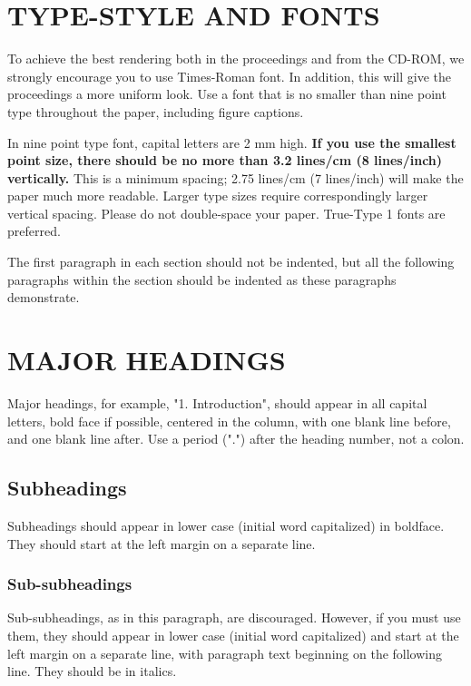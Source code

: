 \documentclass{article}
\begin{document}
\section{TYPE-STYLE AND FONTS}
\label{sec:typestyle}

To achieve the best rendering both in the proceedings and from the CD-ROM, we
strongly encourage you to use Times-Roman font.  In addition, this will give
the proceedings a more uniform look.  Use a font that is no smaller than nine
point type throughout the paper, including figure captions.

In nine point type font, capital letters are 2 mm high.  {\bf If you use the
smallest point size, there should be no more than 3.2 lines/cm (8 lines/inch)
vertically.}  This is a minimum spacing; 2.75 lines/cm (7 lines/inch) will make
the paper much more readable.  Larger type sizes require correspondingly larger
vertical spacing.  Please do not double-space your paper.  True-Type 1 fonts
are preferred.

The first paragraph in each section should not be indented, but all the
following paragraphs within the section should be indented as these paragraphs
demonstrate.

\section{MAJOR HEADINGS}
\label{sec:majhead}

Major headings, for example, "1. Introduction", should appear in all capital
letters, bold face if possible, centered in the column, with one blank line
before, and one blank line after. Use a period (".") after the heading number,
not a colon.

\subsection{Subheadings}
\label{ssec:subhead}

Subheadings should appear in lower case (initial word capitalized) in
boldface.  They should start at the left margin on a separate line.

\subsubsection{Sub-subheadings}
\label{sssec:subsubhead}

Sub-subheadings, as in this paragraph, are discouraged. However, if you
must use them, they should appear in lower case (initial word
capitalized) and start at the left margin on a separate line, with paragraph
text beginning on the following line.  They should be in italics.
\end{document}
